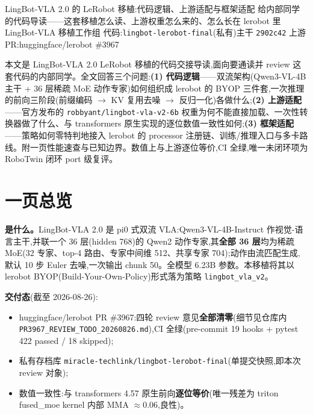 \documentclass[11pt]{ctexart}
\begin{document}
{LingBot-VLA 2.0 的 LeRobot 移植:代码逻辑、上游适配与框架适配}
{给内部同学的代码导读——这套移植怎么读、上游权重怎么来的、怎么长在 lerobot 里}
{LingBot-VLA 移植工作组 \quad 代码:\texttt{lingbot-lerobot-final}(私有)主干 \texttt{2902c42} \quad 上游 PR:huggingface/lerobot \#3967}

\begin{cnabstract}
本文是 LingBot-VLA 2.0 LeRobot 移植的代码交接导读,面向要通读并 review 这套代码的内部同学。全文回答三个问题:\textbf{(1) 代码逻辑}——双流架构(Qwen3-VL-4B 主干 + 36 层稀疏 MoE 动作专家)如何组织成 lerobot 的 BYOP 三件套,一次推理的前向三阶段(前缀编码 $\to$ KV 复用去噪 $\to$ 反归一化)各做什么;\textbf{(2) 上游适配}——官方发布的 \texttt{robbyant/lingbot-vla-v2-6b} 权重为何不能直接加载、一次性转换器做了什么、与 transformers 原生实现的逐位数值一致性如何;\textbf{(3) 框架适配}——策略如何零特判地接入 lerobot 的 processor 注册链、训练/推理入口与多卡路线。附一页性能速查与已知边界。数值上与上游逐位等价,CI 全绿,唯一未闭环项为 RoboTwin 闭环 port 级复评。
\end{cnabstract}

\section{一页总览}

\textbf{是什么。}LingBot-VLA 2.0 是 pi0 式双流 VLA:Qwen3-VL-4B-Instruct 作视觉-语言主干,并联一个 36 层(hidden 768)的 Qwen2 动作专家,其\textbf{全部 36 层}均为稀疏 MoE(32 专家、top-4 路由、专家中间维 512、共享专家 704);动作由流匹配生成,默认 10 步 Euler 去噪,一次输出 chunk 50。全模型 6.23B 参数。本移植将其以 lerobot BYOP(Build-Your-Own-Policy)形式落为策略 \texttt{lingbot\_vla\_v2}。

\textbf{交付态}(截至 2026-08-26):

\begin{itemize}[nosep,leftmargin=1.4em]
  \item huggingface/lerobot PR \#3967:四轮 review 意见\textbf{全部清零}(细节见仓库内 \texttt{PR3967\_REVIEW\_TODO\_20260826.md}),CI 全绿(pre-commit 19 hooks + pytest 422 passed / 18 skipped);
  \item 私有存档库 \texttt{miracle-techlink/lingbot-lerobot-final}(单提交快照,即本次 review 对象);
  \item 数值一致性:与 transformers 4.57 原生前向\textbf{逐位等价}(唯一残差为 triton fused\_moe kernel 内部 MMA $\approx$0.06,良性)。
\end{itemize}
\end{document}
